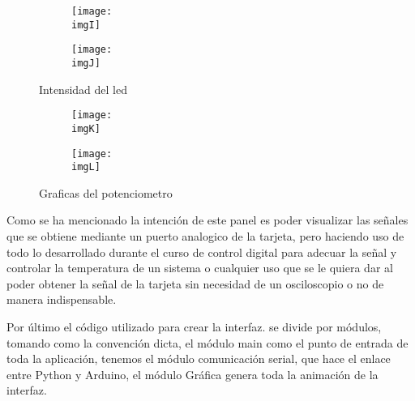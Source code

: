 \documentclass[a4paper,12pt]{article}
\newcommand{\imgI}{img/bajito.jpg}
\newcommand{\imgJ}{img/alto.jpg}
\newcommand{\imgK}{img/potes.png}
\newcommand{\imgL}{img/ruido.png}
\newcommand{\main}{code/main.py}
\newcommand{\graff}{code/Grafica.py}
\newcommand{\serial}{code/ComunicacionSerial.py}
\begin{document}
    \begin{figure}[H] 
        \centering 

        \begin{subfigure}{0.35\linewidth} 
            \texttt{[image: \\imgI]} 
        \end{subfigure} 

        \begin{subfigure}{0.35\textwidth} 
            \texttt{[image: \\imgJ]} 
        \end{subfigure} 

        \caption{Intensidad del led} 
        \label{fig:intensidad}
    \end{figure} 

    \begin{figure}[H] 
        \centering 

        \begin{subfigure}{0.65\linewidth} 
            \texttt{[image: \\imgK]} 
        \end{subfigure} 

        \begin{subfigure}{0.65\textwidth} 
            \texttt{[image: \\imgL]} 
        \end{subfigure} 

        \caption{Graficas del potenciometro} 
    \end{figure} 
    Como se ha mencionado la intención de este panel es poder visualizar las señales que se obtiene mediante un puerto analogico de la tarjeta, pero haciendo uso de todo lo desarrollado durante el curso de control digital para adecuar la señal y controlar la temperatura de un sistema o cualquier uso que se le quiera dar al poder obtener la señal de la tarjeta sin necesidad de un osciloscopio o no de manera indispensable.

    Por último el código utilizado para crear la interfaz. se divide por módulos, tomando como la convención dicta, el módulo main como el punto de entrada de toda la aplicación, tenemos el módulo comunicación serial, que hace el enlace entre Python y Arduino, el módulo Gráfica genera toda la animación de la interfaz.\cite{meier2019python}

    
    
    
\end{document}
